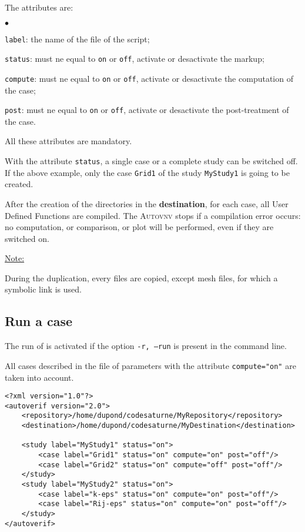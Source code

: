 \documentclass[a4paper,10pt,twoside]{article}
\begin{document}
The attributes are:

\begin{list}{$\bullet$}{}
\item \texttt{label}: the name of the file of the script;
\item \texttt{status}: must ne equal to \texttt{on} or \texttt{off},
activate or desactivate the markup;
\item \texttt{compute}: must ne equal to \texttt{on} or \texttt{off},
activate or desactivate the computation of the case;
\item \texttt{post}: must ne equal to \texttt{on} or \texttt{off},
activate or desactivate the post-treatment of the case.
\end{list}

All these attributes are mandatory.

With the attribute \texttt{status}, a single case or a complete study can be switched off.
If the above example, only the case \texttt{Grid1} of the study \texttt{MyStudy1} is going
to be created.

After the creation of the directories in the \textbf{destination}, for each case, all User Defined Functions
are compiled. The \textsc{Autovnv} stops if a compilation error occurs: no computation, or
comparison, or plot will be performed, even if they are switched on.

\underline{Note:}

During the duplication, every files are copied, except mesh files, for which a symbolic link is used.


\subsection{Run a case}

The run of \CS is activated if the option \texttt{-r, --run} is present in the command line.

All cases described in the file of parameters with the attribute \texttt{compute="on"}
are taken into account.

\begin{verbatim}
<?xml version="1.0"?>
<autoverif version="2.0">
    <repository>/home/dupond/codesaturne/MyRepository</repository>
    <destination>/home/dupond/codesaturne/MyDestination</destination>

    <study label="MyStudy1" status="on">
        <case label="Grid1" status="on" compute="on" post="off"/>
        <case label="Grid2" status="on" compute="off" post="off"/>
    </study>
    <study label="MyStudy2" status="on">
        <case label="k-eps" status="on" compute="on" post="off"/>
        <case label="Rij-eps" status="on" compute="on" post="off"/>
    </study>
</autoverif>
\end{verbatim}
\end{document}
